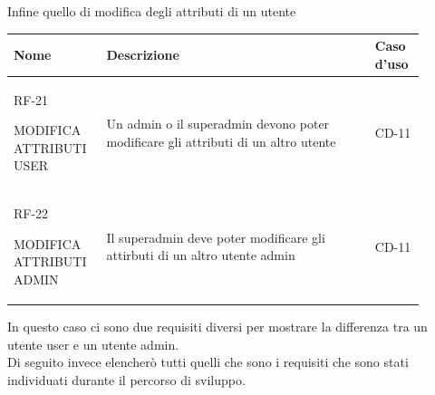 Infine quello di modifica degli attributi di un utente
\begin{center}
    \begin{tabular}{|p{0.2\linewidth}|p{0.60\linewidth}|p{0.10\linewidth}|}
    \hline
    \textbf{Nome} & \textbf{Descrizione} & \textbf{Caso d'uso} \\
    \hline
    \rowcolor{LightOrange}
    RF-21 \par MODIFICA ATTRIBUTI USER & Un admin o il superadmin devono poter modificare gli attributi di un altro utente & CD-11 \\
    \hline
    \rowcolor{LighterOrange}
    RF-22 \par MODIFICA ATTRIBUTI ADMIN & Il superadmin deve poter modificare gli attirbuti di un altro utente admin & CD-11 \\
    \hline
    \end{tabular}
\end{center}
In questo caso ci sono due requisiti diversi per mostrare la differenza tra un utente user e un utente admin.
\\
Di seguito invece elencherò tutti quelli che sono i requisiti che sono stati individuati durante il percorso di sviluppo.
